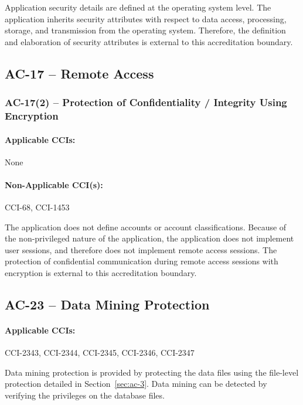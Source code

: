 \documentclass[letterpaper, 10pt, twoside]{article}
\begin{document}
Application security details are defined at the operating system level. The application inherits security attributes with respect to data access, processing, storage, and transmission from the operating system. Therefore, the definition and elaboration of security attributes is external to this accreditation boundary.

\subsection{AC-17 -- Remote Access}

\subsubsection{AC-17(2) -- Protection of Confidentiality / Integrity Using Encryption}

\paragraph{Applicable CCIs:} None

\paragraph{Non-Applicable CCI(s):} CCI-68, CCI-1453

The application does not define accounts or account classifications. Because of the non-privileged nature of the application, the application does not implement user sessions, and therefore does not implement remote access sessions. The protection of confidential communication during remote access sessions with encryption is external to this accreditation boundary.

\subsection{AC-23 -- Data Mining Protection}

\paragraph{Applicable CCIs:} CCI-2343, CCI-2344, CCI-2345, CCI-2346, CCI-2347

Data mining protection is provided by protecting the data files using the file-level protection detailed in Section~\ref{sec:ac-3}. Data mining can be detected by verifying the privileges on the database files.

\clearpage
\printbibliography
\end{document}
